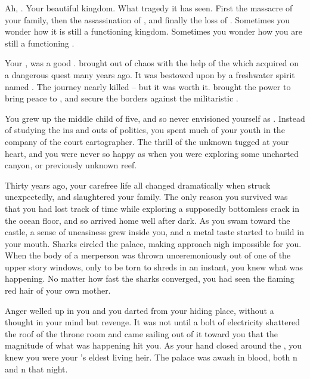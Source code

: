 \documentclass[char]{NeptuneBall}
\begin{document}
\name{\cKing{}}



Ah, \pAtlantis{}. Your beautiful kingdom. What tragedy it has seen. First the massacre of your family, then the assassination of \cQueen{\King{}} \cQueen{}, and finally the loss of \cAriel{\Prince{}} \cAriel{}. Sometimes you wonder how it is still a functioning kingdom. Sometimes you wonder how you are still a functioning \cKing{\King{}}.

Your \cExKing{\parent{}}, \cExKing{\King} \cExKing{} was a good \cExKing{\King{}}. \cExKing{\They{}} brought \pAtlantis{} out of chaos with the help of the \iTrident{\MYname{}} which \cExKing{\they{}} acquired on a dangerous quest many years ago. It was bestowed upon \cExKing{\them{}} by a freshwater spirit named \cNixie{}. The journey nearly killed \cExKing{\them{}} -- but it was worth it. \iTrident{\MYname{}} brought \cExKing{} the power to bring peace to \pAtlantis{}, and secure the borders against the militaristic \pPacifica{}.

You grew up the middle child of five, and so never envisioned yourself as \cKing{\King{}}. Instead of studying the ins and outs of politics, you spent much of your youth in the company of the court cartographer. The thrill of the unknown tugged at your heart, and you were never so happy as when you were exploring some uncharted canyon, or previously unknown reef.

Thirty years ago, your carefree life all changed dramatically when \pPacifica{} struck unexpectedly, and slaughtered your family. The only reason you survived was that you had lost track of time while exploring a supposedly bottomless crack in the ocean floor, and so arrived home well after dark. As you swam toward the castle, a sense of uneasiness grew inside you, and a metal taste started to build in your mouth. Sharks circled the palace, making approach nigh impossible for you. When the body of a merperson was thrown unceremoniously out of one of the upper story windows, only to be torn to shreds in an instant, you knew what was happening. No matter how fast the sharks converged, you had seen the flaming red hair of your own mother.

Anger welled up in you and you darted from your hiding place, without a thought in your mind but revenge. It was not until a bolt of electricity shattered the roof of the throne room and \iTrident{\MYname{}} came sailing out of it toward you that the magnitude of what was happening hit you. As your hand closed around the \iTrident{\MYname{}}, you knew you were your \cExKing{\parent{}}'s eldest living heir. The palace was awash in blood, both \pPacifica{}n and \pAtlantis{}n that night. 
\end{document}
